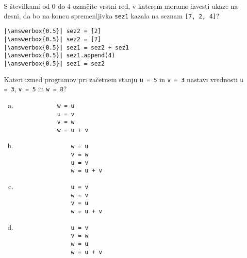 \documentclass[arhiv, 10pt]{../izpit}
\newcommand{\inlinepy}[1]{\texttt{#1}}
\newcommand{\answerbox}[1]{\framebox{\vphantom{\large M}\hspace{#1cm}}}
\begin{document}
        \naloga*
        \begin{multicols}{2}
        \noindent 
        S številkami od $0$ do $4$ označite vrstni red, v katerem moramo izvesti ukaze na desni, da bo na koncu spremenljivka \inlinepy{sez1} kazala na seznam \inlinepy{[7, 2, 4]}?
    
        \columnbreak
        \noindent
        \begin{verbatim}
|\answerbox{0.5}| sez2 = [2]
|\answerbox{0.5}| sez2 = [7]
|\answerbox{0.5}| sez1 = sez2 + sez1
|\answerbox{0.5}| sez1.append(4)
|\answerbox{0.5}| sez1 = sez2

        \end{verbatim}
        \end{multicols}
    
            
        \naloga*
        
        Kateri izmed programov pri začetnem stanju
            \inlinepy{u = 5} in
            \inlinepy{v = 3}
        nastavi vrednosti
            \inlinepy{u = 3},
            \inlinepy{v = 5} in
            \inlinepy{w = 8}?
    
        \begin{multicols}{4}
        \begin{enumerate}[(a)]
\item 
            \begin{verbatim}
            w = u
            u = v
            v = w
            w = u + v
            \end{verbatim}
        
\item 
                \begin{verbatim}
                w = u
                v = w
                u = v
                w = u + v
                \end{verbatim}
            
\item 
                \begin{verbatim}
                u = v
                w = v
                v = u
                w = u + v
                \end{verbatim}
            
\item 
                \begin{verbatim}
                u = v
                v = w
                w = u
                w = u + v
                \end{verbatim}
            
\end{enumerate}

        \end{multicols}
    
\end{document}
